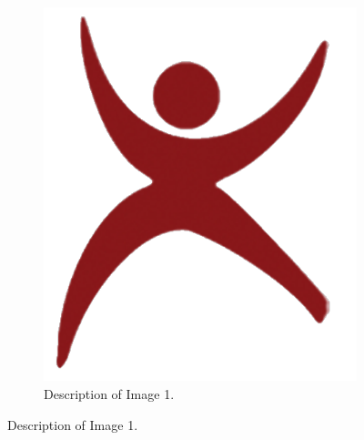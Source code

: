 \documentclass{article}
\begin{document}
	\begin{figure}[h]
		\centering
		\begin{subfigure}[b]
			{0.45\textwidth}
			\centering
			\includegraphics[width=\linewidth]{logo.png}
			\caption{Description of Image 1.}
			\label{fig:image 1}
			

\end{subfigure}
\end{figure}
\end{document}
